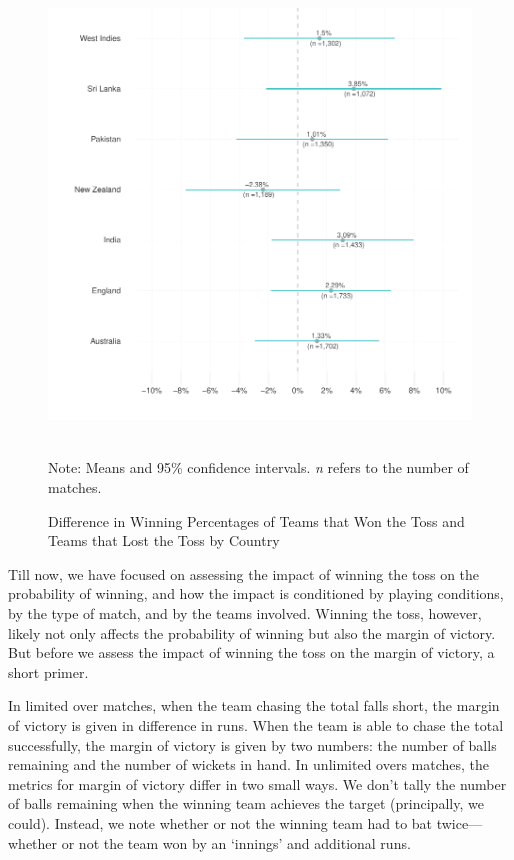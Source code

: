 \documentclass[12pt]{article}
\begin{document}
\begin{figure}[htbp]
\centering
\caption{Difference in Winning Percentages of Teams that Won the Toss and Teams that Lost the Toss by Country}
\includegraphics[scale=1]{../figs/winbyCountry.pdf}
{\footnotesize \\ Note: Means and 95\% confidence intervals. \emph{n} refers to the number of matches.\par}
\label{fig:country}
\end{figure}

Till now, we have focused on assessing the impact of winning the toss on the probability of winning, and how the impact is conditioned by playing conditions, by the type of match, and by the teams involved. Winning the toss, however, likely not only affects the probability of winning but also the margin of victory. But before we assess the impact of winning the toss on the margin of victory, a short primer. 

In limited over matches, when the team chasing the total falls short, the margin of victory is given in difference in runs. When the team is able to chase the total successfully, the margin of victory is given by two numbers: the number of balls remaining and the number of wickets in hand. In unlimited overs matches, the metrics for margin of victory differ in two small ways. We don't tally the number of balls remaining when the winning team achieves the target (principally, we could). Instead, we note whether or not the winning team had to bat twice---whether or not the team won by an `innings' and additional runs.
\end{document}
